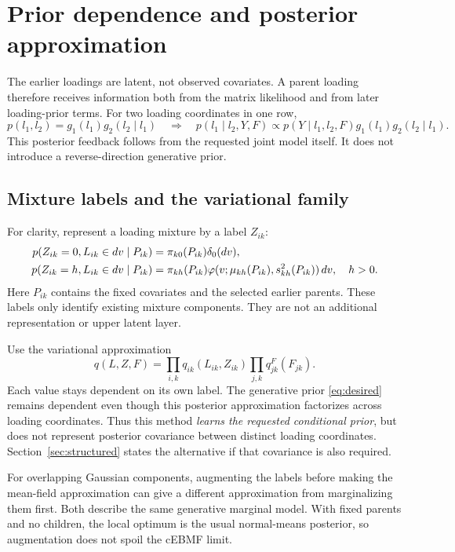 \documentclass[11pt,a4paper]{article}
\newcommand{\Normal}[3]{\varphi(#1;#2,#3)}
\begin{document}
\clearpage
\section{Prior dependence and posterior approximation}
The earlier loadings are latent, not observed covariates. A parent loading
therefore receives information both from the matrix likelihood and from
later loading-prior terms. For two loading coordinates in one row,
\[
p(l_1,l_2)=g_1(l_1)g_2(l_2\mid l_1)
\quad\Longrightarrow\quad
p(l_1\mid l_2,Y,F)\propto p(Y\mid l_1,l_2,F)g_1(l_1)g_2(l_2\mid l_1).
\]
This posterior feedback follows from the requested joint model itself.
It does not introduce a reverse-direction generative prior.

\subsection{Mixture labels and the variational family}
For clarity, represent a loading mixture by a label \(Z_{ik}\):
\begin{align}
p(Z_{ik}=0,L_{ik}\in dv\mid P_{ik})
  &=\pi_{k0}(P_{ik})\delta_0(dv),\notag\\
p(Z_{ik}=h,L_{ik}\in dv\mid P_{ik})
  &=\pi_{kh}(P_{ik})\Normal{v}{\mu_{kh}(P_{ik})}{s_{kh}^2(P_{ik})}\,dv,
  \quad h>0.
\label{eq:mixture}
\end{align}
Here \(P_{ik}\) contains the fixed covariates and the selected earlier
parents. These labels only identify existing mixture components. They
are not an additional representation or upper latent layer.

Use the variational approximation
\begin{equation}
q(L,Z,F)=\prod_{i,k}q_{ik}(L_{ik},Z_{ik})\prod_{j,k}q^F_{jk}(F_{jk}).
\label{eq:q}
\end{equation}
Each value stays dependent on its own label. The generative prior
\eqref{eq:desired} remains dependent even though this posterior
approximation factorizes across loading coordinates. Thus this method
\emph{learns the requested conditional prior}, but does not represent
posterior covariance between distinct loading coordinates. Section~\ref{sec:structured}
states the alternative if that covariance is also required.

For overlapping Gaussian components, augmenting the labels before making
the mean-field approximation can give a different approximation from
marginalizing them first. Both describe the same generative marginal model.
With fixed parents and no children, the local optimum is the usual
normal-means posterior, so augmentation does not spoil the cEBMF limit.
\end{document}
